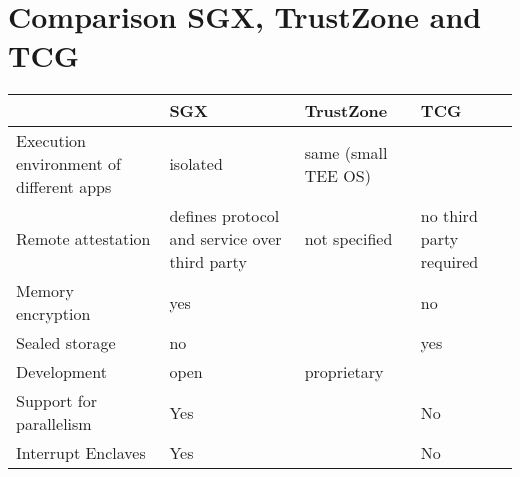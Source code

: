 
\section{Comparison SGX, TrustZone and TCG}
\begin{tabular}{@{}llll@{}}
\toprule
                & SGX & TrustZone & TCG  \\ \midrule
  Execution environment of different apps & isolated            & same (small
  TEE OS)          &  \\
Remote attestation & defines protocol and service over third party            &
not specified          &  no third party required\\
Memory encryption & yes 	& 	& no\\
Sealed storage 	& no 		& 	& yes\\
Development    & open            & proprietary          &  \\
Support for parallelism & Yes 	& 	& No\\
Interrupt Enclaves 	& Yes 	& 	& No \\
\bottomrule
\end{tabular}
